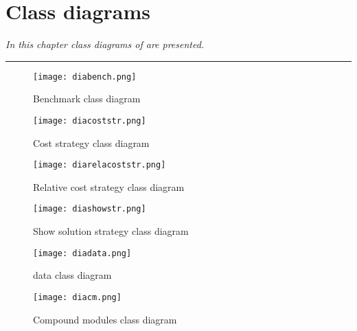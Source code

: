 \chapter{\posl{} Class diagrams}
\label{app:sgp}
\textit{In this chapter class diagrams of \posl{} are presented.}
\vfill
\newpage


\noindent\rule[2pt]{\textwidth}{0.8pt}

\clearpage


\begin{figure}
	\centering
	\texttt{[image: diabench.png]}
	\caption[]{Benchmark class diagram}\label{diag:bench}
\end{figure}

\begin{figure}
	\centering
	\texttt{[image: diacoststr.png]}
	\caption[]{Cost strategy class diagram}\label{diag:coststr}
\end{figure}

\begin{figure}
	\centering
	\texttt{[image: diarelacoststr.png]}
	\caption[]{Relative cost strategy class diagram}\label{diag:relacoststr}
\end{figure}

\begin{figure}
	\centering
	\texttt{[image: diashowstr.png]}
	\caption[]{Show solution strategy class diagram}\label{diag:showstr}
\end{figure}

\begin{figure}
	\centering
	\texttt{[image: diadata.png]}
	\caption[]{\posl{} data class diagram}\label{diag:data}
\end{figure}

\begin{figure}
	\centering
	\texttt{[image: diacm.png]}
	\caption[]{Compound modules class diagram}\label{diag:cm}
\end{figure}

